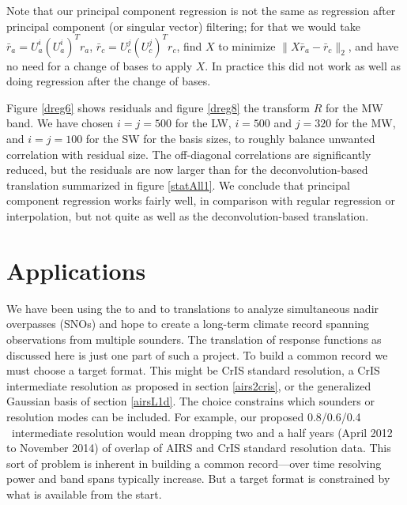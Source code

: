 \documentclass[journal]{IEEEtran}
\begin{document}

Note that our principal component regression is not the same as
regression after principal component (or singular vector) filtering;
for that we would take $\bar r_a = U_a^i (U_a^i)^T r_a$, $\bar r_c =
U_c^j (U_c^j)^T r_c$, find $X$ to minimize $\|X \bar r_a - \bar
r_c\|_2$, and have no need for a change of bases to apply $X$.  In
practice this did not work as well as doing regression after the
change of bases.


Figure \ref{dreg6} shows residuals and figure \ref{dreg8} the
transform $R$ for the {\cris} MW band.  We have chosen $i = j = 500$
for the LW, $i = 500$ and $j = 320$ for the MW, and $i = j = 100$
for the SW for the basis sizes, to roughly balance unwanted
correlation with residual size.  The off-diagonal correlations are
significantly reduced, but the residuals are now larger than for the
deconvolution-based translation summarized in figure \ref{statAll1}.
We conclude that principal component regression works fairly well,
in comparison with regular regression or interpolation, but not
quite as well as the deconvolution-based translation.

\section{Applications}  
\label{appcon}

We have been using the {\airs} to {\cris} and {\iasi} to {\cris}
translations to analyze simultaneous nadir overpasses (SNOs)
\cite{wang2015, sno1} and hope to create a long-term climate record
spanning observations from multiple sounders.  The translation of
response functions as discussed here is just one part of such a
project.  To build a common record we must choose a target format.
This might be CrIS standard resolution, a CrIS intermediate
resolution as proposed in section \ref{airs2cris}, or the
generalized Gaussian basis of section \ref{airsL1d}.  The choice
constrains which sounders or resolution modes can be included.  For
example, our proposed {\cris} 0.8/0.6/0.4 \wn\ intermediate
resolution would mean dropping two and a half years (April 2012 to
November 2014) of overlap of AIRS and CrIS standard resolution data.
This sort of problem is inherent in building a common record---over
time resolving power and band spans typically increase.  But a
target format is constrained by what is available from the start.
\end{document}
